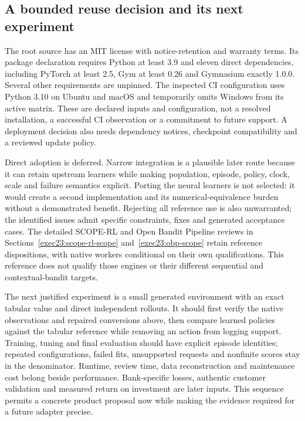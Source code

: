 \subsection{A bounded reuse decision and its next experiment}

The root source has an MIT license with notice-retention and warranty terms.
Its package declaration requires Python at least 3.9 and eleven direct
dependencies, including PyTorch at least 2.5, Gym at least 0.26 and Gymnasium
exactly 1.0.0. Several other requirements are unpinned. The inspected CI
configuration uses Python 3.10 on Ubuntu and macOS and temporarily omits
Windows from its active matrix. These are declared inputs and configuration,
not a resolved installation, a successful CI observation or a commitment to
future support. A deployment decision also needs dependency notices,
checkpoint compatibility and a reviewed update policy.
\citep{exec15_d3rlpy_package}

Direct adoption is deferred. Narrow integration is a plausible later route
because it can retain upstream learners while making population, episode,
policy, clock, scale and failure semantics explicit. Porting the neural
learners is not selected: it would create a second implementation and its
numerical-equivalence burden without a demonstrated benefit. Rejecting all
reference use is also unwarranted; the identified issues admit specific
constraints, fixes and generated acceptance cases. The detailed SCOPE-RL and
Open Bandit Pipeline reviews in Sections~\ref{exec23:scope-rl-scope}
and~\ref{exec23:obp-scope} retain reference dispositions, with native workers
conditional on their own qualifications. This reference does not qualify
those engines or their different sequential and contextual-bandit targets. \citep{exec15_d3rlpy_contract}

The next justified experiment is a small generated environment with an exact
tabular value and direct independent rollouts. It should first verify the
native observations and repaired conversions above, then compare learned
policies against the tabular reference while removing an action from logging
support. Training, tuning and final evaluation should have explicit episode
identities; repeated configurations, failed fits, unsupported requests and
nonfinite scores stay in the denominator. Runtime, review time, data
reconstruction and maintenance cost belong beside performance. Bank-specific
losses, authentic customer validation and measured return on investment are
later inputs. This sequence permits a concrete product proposal now while
making the evidence required for a future adapter precise.
\citep{exec15_d3rlpy_contract}

\label{exec15:d3rlpy-contract-end}
